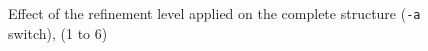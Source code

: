 \documentclass[10pt]{article}
\begin{document}
\begin{figure}[htb]
{  \label{f:pieref5}
 }
\centering
 \caption{Effect of the refinement level applied on the complete structure (\texttt{-a} switch), (1 to 6)}
\label{fig:pieref}
\end{figure}


\begin{figure}[htb]
\centering
\centering
\centering
\end{figure}
\end{document}
